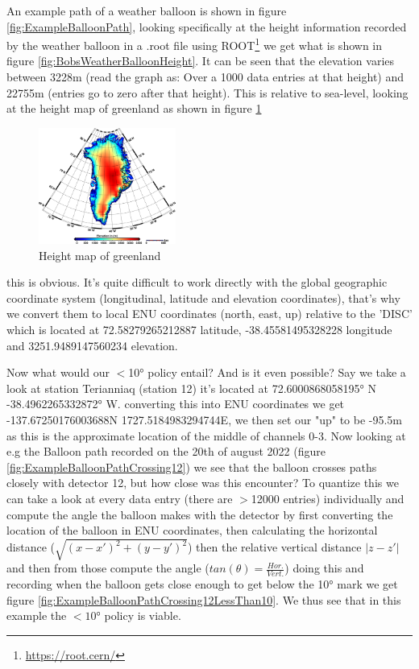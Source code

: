 \documentclass[11pt,a4paper,faculty=we,language=en,doctype=report]{cls/ugent-doc}
\begin{document}
An example path of a weather balloon is shown in figure
\ref{fig:ExampleBalloonPath}, looking specifically at the height information
recorded by the weather balloon in a .root file using
ROOT\footnote{\url{https://root.cern/}} we get what is shown in figure
\ref{fig:BobsWeatherBalloonHeight}. It can be seen that the elevation varies
between 3228m (read the graph as: Over a 1000 data entries at that height) and
22755m (entries go to zero after that height).  This is relative to sea-level,
looking at the height map of greenland as shown in figure
\ref{fig:HeightMapGreenland}
\begin{figure}
  \centering
  \includegraphics[width=0.4\textwidth]{GreenlandHeight.png}
  \caption{Height map of greenland}
  \label{fig:HeightMapGreenland}
\end{figure}
this is obvious.  It's quite difficult to work directly with the global geographic
coordinate system (longitudinal, latitude and elevation coordinates),
that's why we convert them to local ENU coordinates (north, east, up)
relative to the 'DISC' which is located at 72.58279265212887 latitude,
-38.45581495328228 longitude and 3251.9489147560234 elevation.

Now what would our $<$10° policy entail? And is it even possible? 
Say we take a look at station Terianniaq (station 12)
it's located at 72.6000868058195° N -38.4962265332872° W.
converting this into ENU coordinates we get -137.67250176003688N
1727.5184983294744E, we then set our "up" to be -95.5m as this is the
approximate location of the middle of channels 0-3.  Now looking at e.g the
Balloon path recorded on the 20th of august 2022 (figure
\ref{fig:ExampleBalloonPathCrossing12}) we see that the balloon crosses paths
closely with detector 12, but how close was this encounter? To quantize this we can take a look at every data
entry (there are $>$12000 entries) individually and compute the angle the
balloon makes with the detector by first converting the location of the balloon
in ENU coordinates, then calculating the horizontal distance ($\sqrt{(x-x')^2 +
(y-y')^2}$) then the relative vertical distance $|z - z'|$ and then from those
compute the angle ($tan(\theta) = \frac{Hor.}{Vert.}$) doing this and recording
when the balloon gets close enough to get below the 10° mark we get figure
\ref{fig:ExampleBalloonPathCrossing12LessThan10}. We thus see that in this
example the $<10$° policy is viable.
\end{document}
